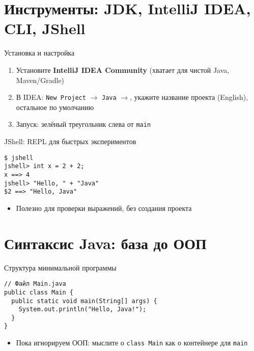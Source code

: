 \documentclass[aspectratio=169]{beamer}
\begin{document}
\section{Инструменты: JDK, IntelliJ IDEA, CLI, JShell}

\begin{frame}{Установка и настройка}
  \begin{enumerate}
    \item Установите \textbf{IntelliJ IDEA Community} (хватает для чистой Java, Maven/Gradle)
    \item В IDEA: \texttt{New Project} $\rightarrow$ \texttt{Java} $\rightarrow$, укажите название проекта (English), остальное по умолчанию
    \item Запуск: зелёный треугольник слева от \texttt{main}
  \end{enumerate}
\end{frame}

\begin{frame}[fragile]{JShell: REPL для быстрых экспериментов}
\lstset{language=JavaLite}
\begin{lstlisting}
$ jshell
jshell> int x = 2 + 2;
x ==> 4
jshell> "Hello, " + "Java"
$2 ==> "Hello, Java"
\end{lstlisting}
  \begin{itemize}
    \item Полезно для проверки выражений, без создания проекта
  \end{itemize}
\end{frame}

\section{Синтаксис Java: база до ООП}

\begin{frame}[fragile]{Структура минимальной программы}
\lstset{language=JavaLite}
\begin{lstlisting}
// Файл Main.java
public class Main {
  public static void main(String[] args) {
    System.out.println("Hello, Java!");
  }
}
\end{lstlisting}
\begin{itemize}
  \item Пока игнорируем ООП: мыслите о \texttt{class Main} как о контейнере для \texttt{main}
\end{itemize}
\end{frame}
\end{document}
